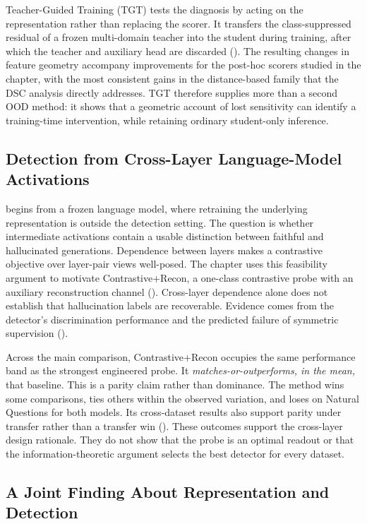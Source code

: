 Teacher-Guided Training (TGT) tests the diagnosis by acting on the representation
rather than replacing the scorer. It transfers the class-suppressed residual of a
frozen multi-domain teacher into the student during training, after which the
teacher and auxiliary head are discarded (). The resulting
changes in feature geometry accompany improvements for the post-hoc scorers studied
in the chapter, with the most consistent gains in the distance-based family that
the DSC analysis directly addresses. TGT therefore supplies more than a second OOD
method: it shows that a geometric account of lost sensitivity can identify a
training-time intervention, while retaining ordinary student-only inference.

\subsection{Detection from Cross-Layer Language-Model Activations}

 begins from a frozen language model, where
retraining the underlying representation is outside the detection setting. The
question is whether intermediate activations contain a usable distinction between
faithful and hallucinated generations. Dependence between layers makes a
contrastive objective over layer-pair views well-posed. The chapter uses this
feasibility argument to motivate Contrastive+Recon, a one-class contrastive probe
with an auxiliary reconstruction channel (). Cross-layer
dependence alone does not establish that hallucination labels are recoverable.
Evidence comes from the detector's discrimination performance and the predicted
failure of symmetric supervision ().

Across the main comparison, Contrastive+Recon occupies the same performance band
as the strongest engineered probe. It \emph{matches-or-outperforms, in the mean,}
that baseline. This is a parity claim rather than dominance. The method wins some
comparisons, ties others within the observed variation, and loses on Natural
Questions for both models. Its cross-dataset results also support parity under
transfer rather than a transfer win (). These outcomes support the cross-layer design
rationale. They do not show that the probe is an optimal readout or that the
information-theoretic argument selects the best detector for every dataset.

\subsection{A Joint Finding About Representation and Detection}
\label{subsec:concl:synthesis}


